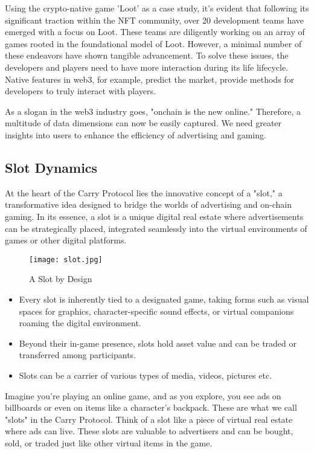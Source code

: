 \begin{itemize}[leftmargin=*]
    Using the crypto-native game ’Loot’ as a case study, it’s evident that following its significant traction within the NFT community, over 20 development teams have emerged with a focus on Loot. These teams are diligently working on an array of games rooted in the foundational model of Loot. However, a minimal number of these endeavors have shown tangible advancement. To solve these issues, the developers and players need to have more interaction during its life lifecycle. Native features in web3, for example, predict the market, provide methods for developers to truly interact with players.
 
    As a slogan in the web3 industry goes, "onchain is the new online." Therefore, a multitude of data dimensions can now be easily captured. We need greater insights into users to enhance the efficiency of advertising and gaming.
\end{itemize}

\subsection{Slot Dynamics}
At the heart of the Carry Protocol lies the innovative concept of a "slot," a transformative idea designed to bridge the worlds of advertising and on-chain gaming. In its essence, a slot is a unique digital real estate where advertisements can be strategically placed, integrated seamlessly into the virtual environments of games or other digital platforms.

\begin{figure}[h]
    \centering
    \texttt{[image: slot.jpg]}
    \caption{A Slot by Design}
    \label{fig:slot_basic}
\end{figure}

\begin{itemize}
    \item Every slot is inherently tied to a designated game, taking forms such as visual spaces for graphics, character-specific sound effects, or virtual companions roaming the digital environment.
    \item Beyond their in-game presence, slots hold asset value and can be traded or transferred among participants.
    \item Slots can be a carrier of various types of media, videos, pictures etc.
\end{itemize}

Imagine you're playing an online game, and as you explore, you see ads on billboards or even on items like a character's backpack. These are what we call "slots" in the Carry Protocol. Think of a slot like a piece of virtual real estate where ads can live. These slots are valuable to advertisers and can be bought, sold, or traded just like other virtual items in the game.

